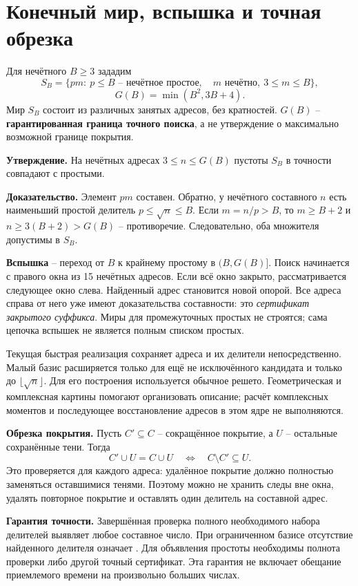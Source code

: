 \documentclass[11pt,a4paper]{article}
\newcommand{\code}[1]{\texttt{\detokenize{#1}}}
\begin{document}
\section{Конечный мир, вспышка и точная обрезка}

Для нечётного $B\ge3$ зададим
\[
S_B=\{pm:\ p\le B\text{ -- нечётное простое},\quad
             m\text{ нечётно},\ 3\le m\le B\},
\]
\[G(B)=\min(B^2,3B+4).\]
Мир $S_B$ состоит из различных занятых адресов, без кратностей. $G(B)$ -- \textbf{гарантированная граница точного поиска}, а не утверждение о максимально возможной границе покрытия.

\textbf{Утверждение.} На нечётных адресах $3\le n\le G(B)$ пустоты $S_B$ в точности совпадают с простыми.

\textbf{Доказательство.} Элемент $pm$ составен. Обратно, у нечётного составного $n$ есть наименьший простой делитель $p\le\sqrt n\le B$. Если $m=n/p>B$, то $m\ge B+2$ и $n\ge3(B+2)>G(B)$ -- противоречие. Следовательно, оба множителя допустимы в $S_B$.

\textbf{Вспышка} -- переход от $B$ к крайнему простому в $(B,G(B)]$. Поиск начинается с правого окна из 15 нечётных адресов. Если всё окно закрыто, рассматривается следующее окно слева. Найденный адрес становится новой опорой. Все адреса справа от него уже имеют доказательства составности: это \emph{сертификат закрытого суффикса}. Миры для промежуточных простых не строятся; сама цепочка вспышек не является полным списком простых.

Текущая быстрая реализация сохраняет адреса и их делители непосредственно. Малый базис расширяется только для ещё не исключённого кандидата и только до $\lfloor\sqrt n\rfloor$. Для его построения используется обычное решето. Геометрическая и комплексная картины помогают организовать описание; расчёт комплексных моментов и последующее восстановление адресов в этом ядре не выполняются.

\textbf{Обрезка покрытия.} Пусть $C'\subseteq C$ -- сокращённое покрытие, а $U$ -- остальные сохранённые тени. Тогда
\[
 C'\cup U=C\cup U
 \quad\Longleftrightarrow\quad
 C\setminus C'\subseteq U.
\]
Это проверяется для каждого адреса: удалённое покрытие должно полностью заменяться оставшимися тенями. Поэтому можно не хранить следы вне окна, удалять повторное покрытие и оставлять один делитель на составной адрес.

\textbf{Гарантия точности.} Завершённая проверка полного необходимого набора делителей выявляет любое составное число. При ограниченном базисе отсутствие найденного делителя означает \code{UNKNOWN}. Для объявления простоты необходимы полнота проверки либо другой точный сертификат. Эта гарантия не включает обещание приемлемого времени на произвольно больших числах.
\end{document}
